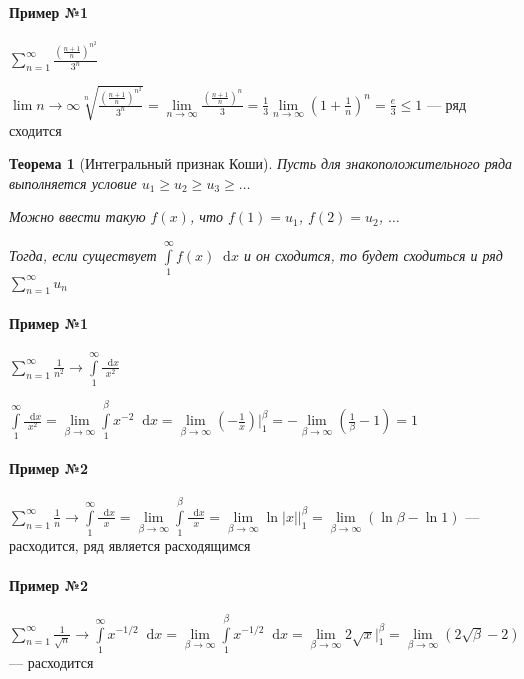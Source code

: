 \documentclass{article}
\newcommand*\diff{\mathop{}\!\mathrm{d}}
\newtheorem{theorem}{Теорема}
\begin{document}
\paragraph{Пример №1} $\sum\limits_{n = 1}^{\infty} \frac{(\frac{n + 1}{n})^{n^2}}{3^{n}}$

$\lim\limits{n \to \infty} \sqrt[n]{\frac{(\frac{n + 1}{n})^{n^2}}{3^{n}}} = \lim\limits_{n \to \infty} \frac{(\frac{n + 1}{n})^{n}}{3} = \frac{1}{3} \lim\limits_{n \to \infty} (1 + \frac{1}{n})^{n} = \frac{e}{3} \le 1$ — ряд сходится

\begin{theorem}[Интегральный признак Коши]

Пусть для знакоположительного ряда выполняется условие $u_1 \ge u_2 \ge u_3 \ge \dots$

Можно ввести такую $f(x)$, что $f(1) = u_1$, $f(2) = u_2$, $\dots$

Тогда, если существует $\int\limits_{1}^{\infty} f(x) \diff x$ и он сходится, то будет сходиться и ряд $\sum\limits_{n = 1}^{\infty} u_{n}$

\end{theorem}

\paragraph{Пример №1} $\sum\limits_{n = 1}^{\infty} \frac{1}{n^2} \to \int\limits_{1}^{\infty} \frac{\diff x}{x^2}$

$\int\limits_{1}^{\infty} \frac{\diff x}{x^2} = \lim\limits_{\beta \to \infty} \int\limits_{1}^{\beta} x^{-2} \diff x = \lim\limits_{\beta \to \infty} (-\frac{1}{x}) \bigg|_{1}^{\beta} = -\lim\limits_{\beta \to \infty} (\frac{1}{\beta} - 1) = 1$

\paragraph{Пример №2} $\sum\limits_{n = 1}^{\infty} \frac{1}{n} \to \int\limits_{1}^{\infty} \frac{\diff x}{x} = \lim\limits_{\beta \to \infty} \int\limits_{1}^{\beta} \frac{\diff x}{x} = \lim\limits_{\beta \to \infty} \ln |x| \bigg|_{1}^{\beta} = \lim\limits_{\beta \to \infty} (\ln \beta - \ln 1)$ — расходится, ряд является расходящимся

\paragraph{Пример №2} $\sum\limits_{n = 1}^{\infty} \frac{1}{\sqrt{n}} \to \int\limits_{1}^{\infty} x^{-1/2} \diff x = \lim\limits_{\beta \to \infty} \int\limits_{1}^{\beta} x^{-1/2} \diff x = \lim\limits_{\beta \to \infty} 2 \sqrt{x} \bigg|_{1}^{\beta} = \lim\limits_{\beta \to \infty} (2\sqrt{\beta} - 2)$ — расходится
\end{document}
